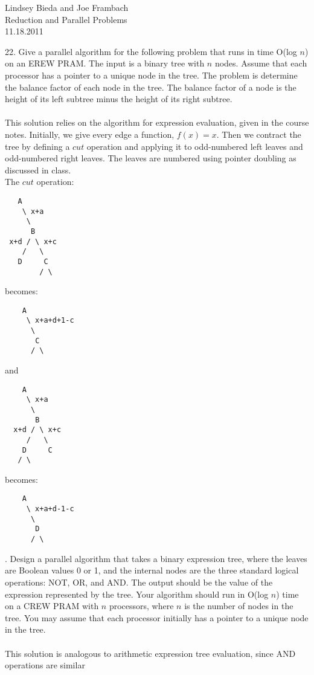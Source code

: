 \documentclass[10pt]{article}
\begin{document}
	\begin{flushright}
	Lindsey Bieda and Joe Frambach\\
	Reduction and Parallel Problems\\
	11.18.2011
	\end{flushright}


22. Give a parallel algorithm for the following problem that runs in time O(log $n$) on an EREW PRAM.
The input is a binary tree with $n$ nodes. Assume that each processor has a pointer to a unique node
in the tree. The problem is determine the balance factor of each node in the tree. The balance factor
of a node is the height of its left subtree minus the height of its right subtree.
\\
\\
This solution relies on the algorithm for expression evaluation, given in the course notes.
Initially, we give every edge a function, $f(x) = x$. Then we contract the tree by defining a $cut$
operation and applying it to odd-numbered left leaves and odd-numbered right leaves. The leaves
are numbered using pointer doubling as discussed in class.\\
The $cut$ operation:\\
\begin{verbatim}
   A
    \ x+a
     \
      B
 x+d / \ x+c
    /   \
   D     C
        / \
\end{verbatim}
becomes:
\begin{verbatim}
    A
     \ x+a+d+1-c
      \
       C
      / \
\end{verbatim}
and
\begin{verbatim}
    A
     \ x+a
      \
       B
  x+d / \ x+c
     /   \
    D     C
   / \
\end{verbatim}
becomes:
\begin{verbatim}
    A
     \ x+a+d-1-c
      \
       D
      / \
\end{verbatim}
\newpage
24. Design a parallel algorithm that takes a binary expression tree, where the leaves are Boolean values
0 or 1, and the internal nodes are the three standard logical operations: NOT, OR, and AND. The
output should be the value of the expression represented by the tree. Your algorithm should run in
O(log $n$) time on a CREW PRAM with $n$ processors, where $n$ is the number of nodes in the tree. You
may assume that each processor initially has a pointer to a unique node in the tree.
\\
\\
This solution is analogous to arithmetic expression tree evaluation, since AND operations are similar
\end{document}

